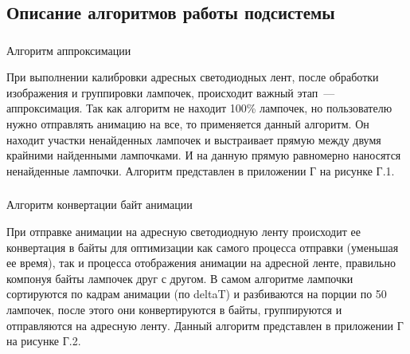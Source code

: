 \subsection{Описание алгоритмов работы подсистемы}
\label{sec:develop:algorithms}

\subsubsection{} Алгоритм аппроксимации
\label{sec:develop:algorithms:approximation}

При выполнении калибровки адресных светодиодных лент, после обработки изображения и группировки лампочек, происходит важный этап~--- аппроксимация. Так как алгоритм не находит 100\% лампочек, но пользователю нужно отправлять анимацию на все, то применяется данный алгоритм. Он находит участки ненайденных лампочек и выстраивает прямую между двумя крайними найденными лампочками. И на данную прямую равномерно наносятся ненайденные лампочки. Алгоритм представлен в приложении Г на рисунке Г.1.

\subsubsection{} Алгоритм конвертации байт анимации
\label{sec:develop:algorithms:bytesSending}

При отправке анимации на адресную светодиодную ленту происходит ее конвертация в байты для оптимизации как самого процесса отправки (уменьшая ее время), так и процесса отображения анимации на адресной ленте, правильно компонуя байты лампочек друг с другом. В самом алгоритме лампочки сортируются по кадрам анимации (по deltaT) и разбиваются на порции по 50 лампочек, после этого они конвертируются в байты, группируются и отправляются на адресную ленту. Данный алгоритм представлен в приложении Г на рисунке Г.2.